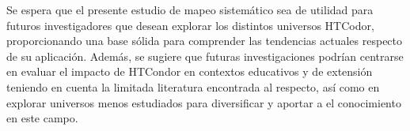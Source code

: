 Se espera que el presente estudio de mapeo sistemático sea de utilidad para futuros investigadores que desean explorar los distintos universos HTCodor, proporcionando una base sólida para comprender las tendencias actuales respecto de su aplicación. Además, se sugiere que futuras investigaciones podrían centrarse en evaluar el impacto de HTCondor en contextos educativos y de extensión teniendo en cuenta la limitada literatura encontrada al respecto, así como en explorar universos menos estudiados para diversificar y aportar a el conocimiento en este campo.

